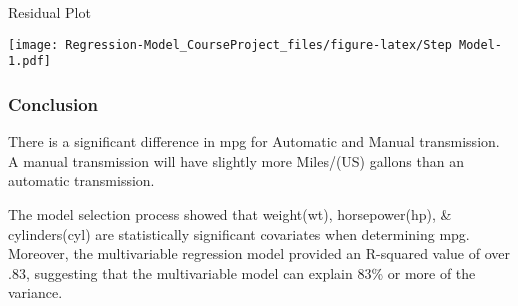 \documentclass[
]{article}
\begin{document}
Residual Plot

\texttt{[image: Regression-Model\_CourseProject\_files/figure-latex/Step Model-1.pdf]}

\hypertarget{conclusion}{%
\subsubsection{Conclusion}\label{conclusion}}

There is a significant difference in mpg for Automatic and Manual
transmission. A manual transmission will have slightly more Miles/(US)
gallons than an automatic transmission.

The model selection process showed that weight(wt), horsepower(hp), \&
cylinders(cyl) are statistically significant covariates when determining
mpg. Moreover, the multivariable regression model provided an R-squared
value of over .83, suggesting that the multivariable model can explain
83\% or more of the variance.
\end{document}
